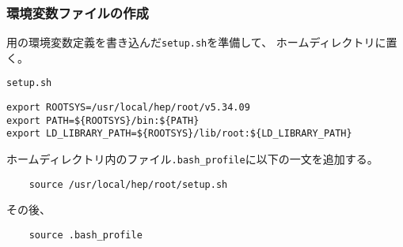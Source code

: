\subsubsection*{環境変数ファイルの作成}
\ROOT 用の環境変数定義を書き込んだ\verb|setup.sh|を準備して、
ホームディレクトリに置く。
\begin{itembox}{\texttt{setup.sh}}
\begin{verbatim}
export ROOTSYS=/usr/local/hep/root/v5.34.09
export PATH=${ROOTSYS}/bin:${PATH} 
export LD_LIBRARY_PATH=${ROOTSYS}/lib/root:${LD_LIBRARY_PATH}
\end{verbatim}
\end{itembox}
ホームディレクトリ内のファイル\verb|.bash_profile|に以下の一文を追加する。
\begin{verbatim}
	source /usr/local/hep/root/setup.sh
\end{verbatim}
その後、
\begin{verbatim}
	source .bash_profile
\end{verbatim}
